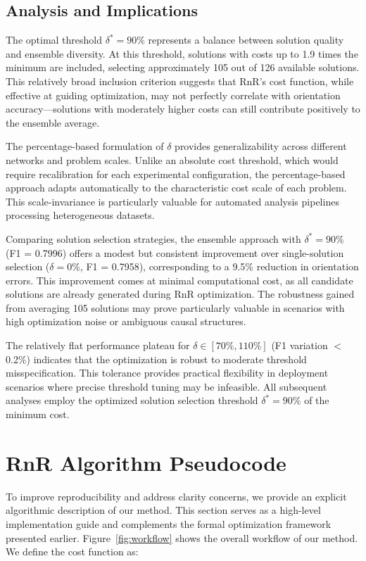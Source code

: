 \subsection{Analysis and Implications}

The optimal threshold $\delta^* = 90\%$ represents a balance between solution quality and ensemble diversity. At this threshold, solutions with costs up to 1.9 times the minimum are included, selecting approximately 105 out of 126 available solutions. This relatively broad inclusion criterion suggests that RnR's cost function, while effective at guiding optimization, may not perfectly correlate with orientation accuracy---solutions with moderately higher costs can still contribute positively to the ensemble average.

The percentage-based formulation of $\delta$ provides generalizability across different networks and problem scales. Unlike an absolute cost threshold, which would require recalibration for each experimental configuration, the percentage-based approach adapts automatically to the characteristic cost scale of each problem. This scale-invariance is particularly valuable for automated analysis pipelines processing heterogeneous datasets.

Comparing solution selection strategies, the ensemble approach with $\delta^* = 90\%$ (F1 = 0.7996) offers a modest but consistent improvement over single-solution selection ($\delta = 0\%$, F1 = 0.7958), corresponding to a 9.5\% reduction in orientation errors. This improvement comes at minimal computational cost, as all candidate solutions are already generated during RnR optimization. The robustness gained from averaging 105 solutions may prove particularly valuable in scenarios with high optimization noise or ambiguous causal structures.

The relatively flat performance plateau for $\delta \in [70\%, 110\%]$ (F1 variation $<$ 0.2\%) indicates that the optimization is robust to moderate threshold misspecification. This tolerance provides practical flexibility in deployment scenarios where precise threshold tuning may be infeasible. All subsequent analyses employ the optimized solution selection threshold $\delta^* = 90\%$ of the minimum cost.


\section{RnR Algorithm Pseudocode}
\label{appx:algor}
To improve reproducibility and address clarity concerns, we provide an explicit algorithmic description of our method. This section serves as a high-level implementation guide and complements the formal optimization framework presented earlier. Figure~\ref{fig:workflow} shows the overall workflow of our method. We define the cost function as:

